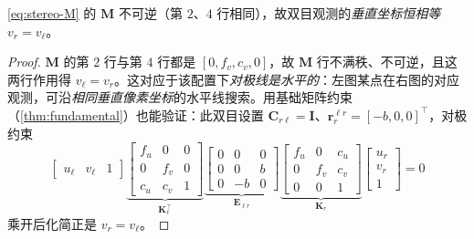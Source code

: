 \begin{proposition}\label{prop:stereo-M}
\cref{eq:stereo-M} 的 $\mathbf{M}$ 不可逆（第 $2$、$4$ 行相同），故双目观测的\emph{垂直坐标恒相等} $v_r=v_\ell$。
\end{proposition}
\begin{proof}
$\mathbf{M}$ 的第 $2$ 行与第 $4$ 行都是 $[0,f_v,c_v,0]$，故 $\mathbf{M}$ 行不满秩、不可逆，且这两行作用得 $v_\ell=v_r$。这对应于该配置下\emph{对极线是水平的}：左图某点在右图的对应观测，可沿\emph{相同垂直像素坐标}的水平线搜索。用基础矩阵约束（\cref{thm:fundamental}）也能验证：此双目设置 $\mathbf{C}_{r\ell}=\mathbf{I}$、$\mathbf{r}_r^{\ell r}=[-b,0,0]^\top$，对极约束
\[
  \begin{bmatrix}u_\ell&v_\ell&1\end{bmatrix}
  \underbrace{\begin{bmatrix}f_u&0&0\\0&f_v&0\\c_u&c_v&1\end{bmatrix}}_{\mathbf{K}_\ell^\top}
  \underbrace{\begin{bmatrix}0&0&0\\0&0&b\\0&-b&0\end{bmatrix}}_{\mathbf{E}_{\ell r}}
  \underbrace{\begin{bmatrix}f_u&0&c_u\\0&f_v&c_v\\0&0&1\end{bmatrix}}_{\mathbf{K}_r}
  \begin{bmatrix}u_r\\v_r\\1\end{bmatrix}=0
\]
乘开后化简正是 $v_r=v_\ell$。
\end{proof}

